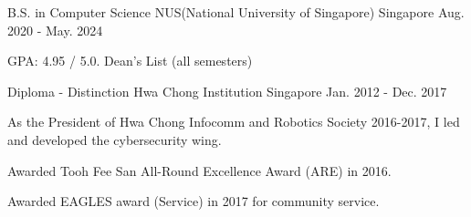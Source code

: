 

\begin{cventries}

  \cventry
    {B.S. in Computer Science} %
    {NUS(National University of Singapore)} %
    {Singapore} %
    {Aug. 2020 - May. 2024} %
    {
      \begin{cvitems} %
      \item {GPA: 4.95 / 5.0. Dean's List (all semesters)}
      \end{cvitems}
    }

  \cventry
    {Diploma - Distinction} %
    {Hwa Chong Institution} %
    {Singapore} %
    {Jan. 2012 - Dec. 2017} %
    {
      \begin{cvitems} %
      \item {As the President of Hwa Chong Infocomm and Robotics Society 2016-2017, I led and developed the cybersecurity wing.}
      \item {Awarded Tooh Fee San All-Round Excellence Award (ARE) in 2016.}
      \item {Awarded EAGLES award (Service) in 2017 for community service.}
      \end{cvitems}
    }

\end{cventries}
